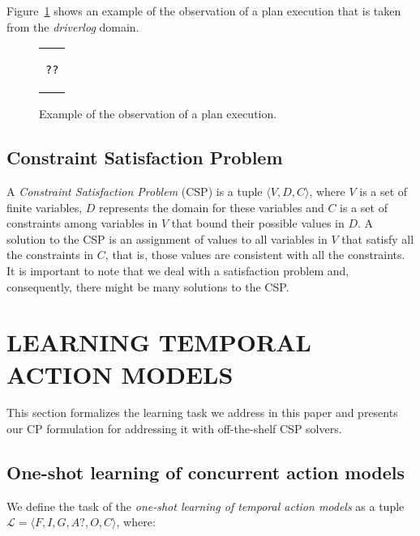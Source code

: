 \documentclass{ecai}
\newcommand{\tup}[1]{{\langle #1 \rangle}}
\begin{document}
Figure~\ref{fig:exampleObservations} shows an example of the observation of a plan execution that is taken from the {\em driverlog} domain.

\begin{figure}
\begin{tabular}{p{5cm}}
\begin{scriptsize}    
\begin{verbatim}
??
\end{verbatim}
\end{scriptsize}    
\end{tabular}
\caption{Example of the observation of a plan execution.}
\label{fig:exampleObservations}
\end{figure}


\subsection{Constraint Satisfaction Problem}
\label{sec:csp}

A {\em Constraint Satisfaction Problem} (CSP) is a tuple $\tup{V,D,C}$, where $V$ is a set of finite variables, $D$ represents the domain for these variables and $C$ is a set of constraints among variables in $V$ that bound their possible values in $D$.
A solution to the CSP is an assignment of values to all variables in $V$ that satisfy all the constraints in $C$, that is, those values are consistent with all the constraints. It is important to note that we deal with a satisfaction problem and, consequently, there might be many solutions to the CSP.



\section{LEARNING TEMPORAL ACTION MODELS}
\label{section:learningTemporalModels}

This section formalizes the learning task we address in this paper and presents our CP formulation for addressing it with off-the-shelf CSP solvers.

\subsection{One-shot learning of concurrent action models}
\label{subsec:ones}

We define the task of the {\em one-shot learning of temporal action models} as a tuple $\mathcal{L}=\tup{F,I,G,A?,O,C}$, where:
\end{document}
